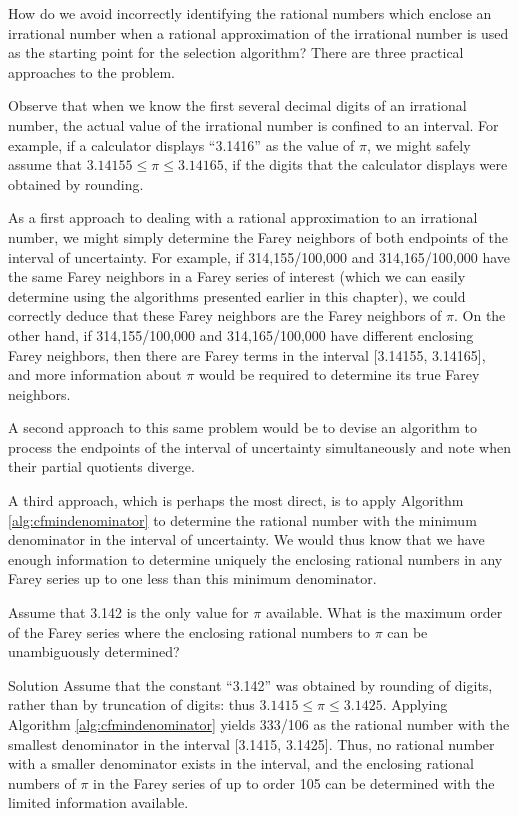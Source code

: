 How do we avoid incorrectly identifying the rational
numbers which enclose an irrational number when a
rational approximation of the irrational number is
used as the starting point for the selection algorithm?
There are three practical approaches to the problem.

Observe that when we know
the first several decimal digits of an irrational number,
the actual value of the irrational number is confined
to an interval.  For example, if a calculator displays
``3.1416'' as the value of $\pi$, we might safely
assume that $3.14155 \leq \pi \leq 3.14165$, if the
digits that the calculator displays were 
obtained by rounding.  

As a first approach to dealing with a rational approximation
to an irrational number,
we might simply determine the
Farey neighbors of both endpoints of the interval of
uncertainty.  For example, if
314,155/100,000 and 314,165/100,000 have the same 
Farey neighbors in a Farey series of interest (which we can
easily determine using the algorithms presented earlier
in this chapter), we could
correctly deduce that these Farey neighbors are the
Farey neighbors of $\pi$.  On the other hand,
if 314,155/100,000 and 314,165/100,000 have different
enclosing Farey neighbors, then there are Farey 
terms in the interval [3.14155, 3.14165],
and more information about $\pi$
would be required to determine its true Farey neighbors.

A second approach to this same problem would be to devise an
algorithm to process
the endpoints of the interval of uncertainty simultaneously and note
when their partial quotients diverge.  

A third approach, which is 
perhaps the most direct, is to apply 
Algorithm \cfryzeroxrefhyphen{}\ref{alg:cfmindenominator} to determine
the rational number with the minimum denominator in the interval of uncertainty.
We would thus know that we have enough information to determine uniquely the
enclosing rational numbers in any Farey series up to one less than this 
minimum denominator.

\begin{vworkexamplestatement}
\label{ex:ccfr0:sptq0:02}
Assume that 3.142 is the only value for $\pi$ available.  What is the maximum
order of the Farey series where the enclosing rational numbers to $\pi$ can
be unambiguously determined?
\end{vworkexamplestatement}
\begin{vworkexampleparsection}{Solution}
Assume that the constant ``3.142'' was obtained by rounding of digits, rather than
by truncation of digits:  thus $3.1415 \leq \pi \leq 3.1425$.  Applying
Algorithm \cfryzeroxrefhyphen{}\ref{alg:cfmindenominator} yields 333/106
as the rational number with the smallest denominator in the interval
[3.1415, 3.1425].  Thus, no rational number with a smaller denominator exists
in the interval, and the enclosing rational numbers of $\pi$ in the Farey series of
up to order 105 can be determined with the limited information available.
\end{vworkexampleparsection}
\vworkexamplefooter{}


